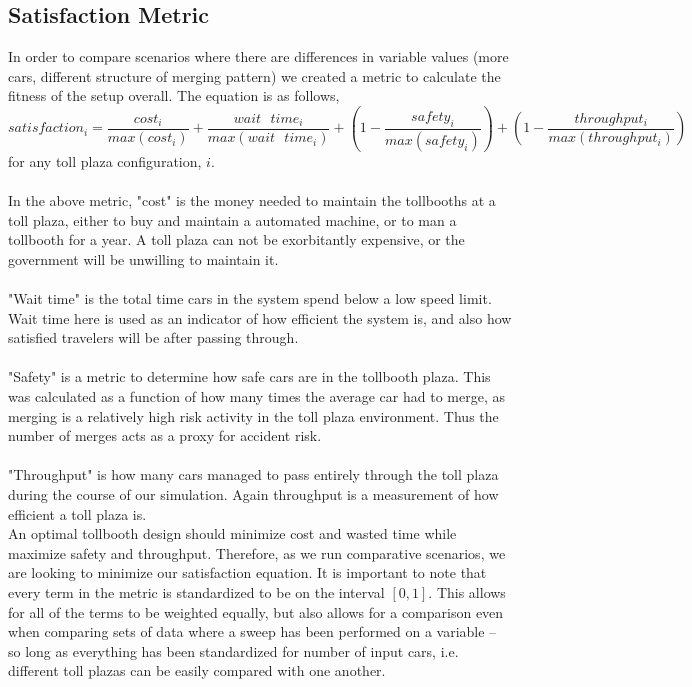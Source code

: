 \documentclass{article}
\begin{document}
\subsection{Satisfaction Metric}
In order to compare scenarios where there are differences in variable values (more cars, different structure of merging pattern) we created a metric to calculate the fitness of the setup overall. The equation is as follows, \\
\begin{equation}
 satisfaction_{i} = \frac{cost_{i}}{max(cost_i)} + \frac{wait\text{ } time_{i}}{max(wait\text{ } time_{i})} + (1-\frac{safety_i}{max(safety_i)}) + (1-\frac{throughput_i}{max(throughput_{i})})   
\end{equation}
for any toll plaza configuration, $i$. \\ \\
In the above metric, "cost" is the money needed to maintain the tollbooths at a toll plaza, either to buy and maintain a automated machine, or to man a tollbooth for a year. A toll plaza can not be exorbitantly expensive, or the government will be unwilling to maintain it.\\ \\
"Wait time" is the total time cars in the system spend below a low speed limit. Wait time here is used as an indicator of how efficient the system is, and also how satisfied travelers will be after passing through. \\ \\
"Safety" is a metric to determine how safe cars are in the tollbooth plaza. This was calculated as a function of how many times the average car had to merge, as merging is a relatively high risk activity in the toll plaza environment. Thus the number of merges acts as a proxy for accident risk. \\ \\
"Throughput" is how many cars managed to pass entirely through the toll plaza during the course of our simulation. Again throughput is a measurement of how efficient a toll plaza is.\\

An optimal tollbooth design should minimize cost and wasted time while maximize safety and throughput. Therefore, as we run comparative scenarios, we are looking to minimize our satisfaction equation. It is important to note that every term in the metric is standardized to be on the interval $[0,1]$. This allows for all of the terms to be weighted equally, but also allows for a comparison even when comparing sets of data where a sweep has been performed on a variable -- so long as everything has been standardized for number of input cars, i.e. different toll plazas can be easily compared with one another.
\end{document}
